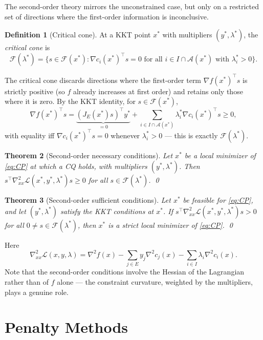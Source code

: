 \documentclass[11pt,a4paper]{report}
\theoremstyle{plain}
\newtheorem{theorem}{Theorem}[chapter]
\theoremstyle{definition}
\newtheorem{definition}[theorem]{Definition}
\newcommand{\grad}{\nabla}
\newcommand{\hess}{\nabla^{2}}
\newcommand{\trans}{^{\top}}
\begin{document}
The second-order theory mirrors the unconstrained case, but only on a
restricted set of directions where the first-order information is
inconclusive.

\begin{definition}[Critical cone]
At a KKT point $x^{*}$ with multipliers $(y^{*},\lambda^{*})$, the
\emph{critical cone} is
\[
\mathcal{F}(\lambda^{*})=\{s\in\mathcal{F}(x^{*}):
\grad c_{i}(x^{*})\trans s=0\text{ for all }i\in I\cap\mathcal{A}(x^{*})
\text{ with }\lambda^{*}_{i}>0\}.
\]
\end{definition}

The critical cone discards directions where the first-order term
$\grad f(x^{*})\trans s$ is strictly positive (so $f$ already increases at
first order) and retains only those where it is zero. By the KKT identity, for
$s\in\mathcal{F}(x^{*})$,
\[
\grad f(x^{*})\trans s
=\underbrace{(J_{E}(x^{*})s)\trans y^{*}}_{=0}
+\sum_{i\in I\cap\mathcal{A}(x^{*})}\lambda^{*}_{i}\grad c_{i}(x^{*})\trans s
\ge 0,
\]
with equality iff $\grad c_{i}(x^{*})\trans s=0$ whenever $\lambda^{*}_{i}>0$
— this is exactly $\mathcal{F}(\lambda^{*})$.

\begin{theorem}[Second-order necessary conditions]\label{thm:CP-SO-nec}
Let $x^{*}$ be a local minimizer of \eqref{eq:CP} at which a CQ holds, with
multipliers $(y^{*},\lambda^{*})$. Then
$s\trans\hess_{xx}\mathcal{L}(x^{*},y^{*},\lambda^{*})s\ge 0$ for all
$s\in\mathcal{F}(\lambda^{*})$. \qed
\end{theorem}

\begin{theorem}[Second-order sufficient conditions]\label{thm:CP-SO-suf}
Let $x^{*}$ be feasible for \eqref{eq:CP}, and let $(y^{*},\lambda^{*})$
satisfy the KKT conditions at $x^{*}$. If
$s\trans\hess_{xx}\mathcal{L}(x^{*},y^{*},\lambda^{*})s>0$
for all $0\ne s\in\mathcal{F}(\lambda^{*})$, then $x^{*}$ is a strict local
minimizer of \eqref{eq:CP}. \qed
\end{theorem}

Here
\[
\hess_{xx}\mathcal{L}(x,y,\lambda)
=\hess f(x)-\sum_{j\in E}y_{j}\hess c_{j}(x)-\sum_{i\in I}\lambda_{i}\hess c_{i}(x).
\]
Note that the second-order conditions involve the Hessian of the Lagrangian
rather than of $f$ alone — the constraint curvature, weighted by the
multipliers, plays a genuine role.


\chapter{Penalty Methods}
\end{document}
